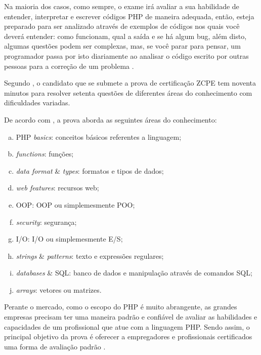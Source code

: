 Na maioria dos casos, como sempre, o exame irá avaliar a sua habilidade de
entender, interpretar e escrever códigos \acs{PHP} de maneira adequada, então,
esteja preparado para ser analizado através de exemplos de códigos nos quais
você deverá entender: como funcionam, qual a saída e se há algum \acs{bug},
além disto, algumas questões podem ser complexas, mas, se você parar para
pensar, um programador passa por isto diariamente ao analisar o código escrito
por outras pessoas para a correção de um problema
\cite{theZendPHPCertificationPracticeTestBook}.

Segundo , o candidato que se
submete a prova de certificação \acs{ZCPE} tem noventa minutos para resolver 
setenta questões de diferentes áreas do conhecimento com dificuldades variadas.

De acordo com , a prova aborda as seguintes áreas do
conhecimento:

\begin{enumerate}[a)]
    \item \acs{PHP} \textit{basics}: 				conceitos básicos referentes a
    linguagem;
    \item \textit{functions}: 						funções;
    \item \textit{data format} \& \textit{types}: 	formatos e tipos de
    dados;
    \item \textit{web features}: 					recursos web;
    \item \acs{OOP}:								\acl{OOP} ou simplemesmente \ac{POO};
    \item \textit{security}: 						segurança;
    \item \acs{I/O}: 								\acl{I/O} ou simplemesmente \ac{E/S};
    \item \textit{strings} \& \textit{patterns}: 	texto e expressões
    regulares;
    \item \textit{databases} \& \acs{SQL}: 		banco de dados e
    manipulação através de comandos \ac{SQL};
    \item \textit{arrays}: 						vetores ou matrizes.
\end{enumerate}

Perante o mercado, como o escopo do PHP é muito abrangente, as grandes empresas
precisam ter uma maneira padrão e confiável de avaliar as habilidades e 
capacidades de um profissional que atue com a linguagem PHP. Sendo assim, o
principal objetivo da prova é oferecer a empregadores e profissionais 
certificados uma forma de avaliação padrão \cite{zendPhp5CertificationStudyGuide}.

